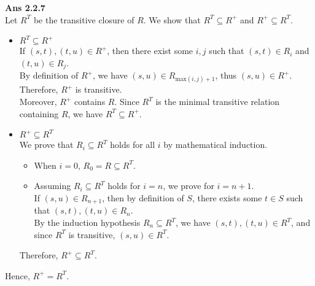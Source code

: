 \documentclass[a4paper,11pt,fleqn,dvipdfmx]{article}
\newcommand{\ansen}[1]{\noindent\textbf{Ans #1}\\[2mm]}
\newcommand{\qed}[0]{\hfill\fbox{}}
\begin{document}
    \ansen{2.2.7}
        Let $R^{T}$ be the transitive closure of $R$. We show that $R^{T} \subseteq R^{+}$ and $R^{+} \subseteq R^{T}$.
        \begin{itemize}
            \item $R^{T} \subseteq R^{+}$ \\[2mm]
            If $(s,t),(t,u) \in R^{+}$, then there exist some $i,j$ such that $(s,t) \in R_i$ and $(t,u) \in R_j$. \\
            By definition of $R^{+}$, we have $(s,u) \in R_{\mathrm{max}(i,j)+1}$, thus $(s,u) \in R^{+}$. \\
            Therefore, $R^{+}$ is transitive. \\
            Moreover, $R^{+}$ contains $R$. Since $R^{T}$ is the minimal transitive relation containing $R$, we have $R^{T} \subseteq R^{+}$.
            \item $R^{+} \subseteq R^{T}$ \\[2mm]
            We prove that $R_i \subseteq R^{T}$ holds for all $i$ by mathematical induction.
            \begin{itemize}
                \item When $i=0$, $R_0 = R \subseteq R^{T}$.
                \item Assuming $R_i \subseteq R^{T}$ holds for $i=n$, we prove for $i=n+1$. \\
                If $(s,u) \in R_{n+1}$, then by definition of $S$, there exists some $t \in S$ such that $(s,t),(t,u) \in R_n$. \\
                By the induction hypothesis $R_n \subseteq R^{T}$, we have $(s,t),(t,u) \in R^{T}$, and since $R^{T}$ is transitive, $(s,u) \in R^{T}$.
            \end{itemize}
            Therefore, $R^{+} \subseteq R^{T}$.
        \end{itemize}
        Hence, $R^{+} = R^{T}$.\qed
\end{document}
